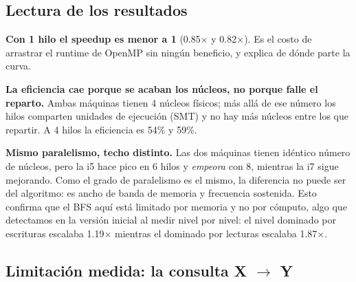 \documentclass[11pt,a4paper]{article}
\begin{document}
\begin{center}
\end{center}

\subsection*{Lectura de los resultados}

\textbf{Con 1 hilo el speedup es menor a 1} (0.85$\times$ y 0.82$\times$). Es
el costo de arrastrar el runtime de OpenMP sin ningún beneficio, y explica de
dónde parte la curva.

\textbf{La eficiencia cae porque se acaban los núcleos, no porque falle el
reparto.} Ambas máquinas tienen 4 núcleos físicos; más allá de ese número los
hilos comparten unidades de ejecución (SMT) y no hay más núcleos entre los que
repartir. A 4 hilos la eficiencia es 54\% y 59\%.

\textbf{Mismo paralelismo, techo distinto.} Las dos máquinas tienen idéntico
número de núcleos, pero la i5 hace pico en 6 hilos y \emph{empeora} con 8,
mientras la i7 sigue mejorando. Como el grado de paralelismo es el mismo, la
diferencia no puede ser del algoritmo: es ancho de banda de memoria y
frecuencia sostenida. Esto confirma que el BFS aquí está limitado por memoria y
no por cómputo, algo que detectamos en la versión inicial al medir nivel por
nivel: el nivel dominado por escrituras escalaba 1.19$\times$ mientras el
dominado por lecturas escalaba 1.87$\times$.

\subsection*{Limitación medida: la consulta X $\to$ Y}
\end{document}
